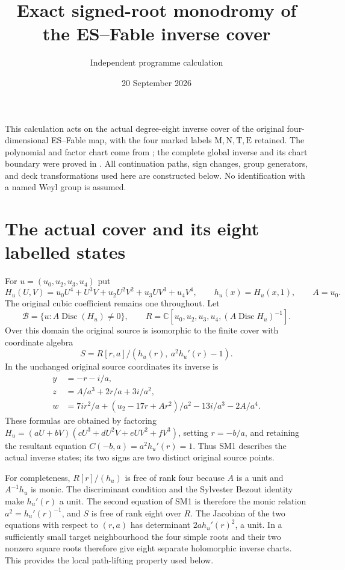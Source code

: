 \documentclass[11pt]{article}
\title{Exact signed-root monodromy of the ES--Fable inverse cover}
\author{Independent programme calculation}
\date{20 September 2026}
\newcommand{\C}{\mathbb C}
\newcommand{\Disc}{\operatorname{Disc}}
\begin{document}
\maketitle

This calculation acts on the actual degree-eight inverse cover of
the original four-dimensional ES--Fable map, with the four marked
labels $\mathrm M,\mathrm N,\mathrm T,\mathrm E$ retained.
The polynomial and factor chart come from \cite{ES488}; the complete
global inverse and its chart boundary were proved in \cite{Global}.
All continuation paths, sign changes, group generators, and deck
transformations used here are constructed below. No identification
with a named Weyl group is assumed.

\section{The actual cover and its eight labelled states}
For $u=(u_0,u_2,u_3,u_4)$ put
\[
 H_u(U,V)=u_0U^4+U^3V+u_2U^2V^2+u_3UV^3+u_4V^4,
 \qquad h_u(x)=H_u(x,1),\qquad A=u_0.
\]
The original cubic coefficient remains one throughout. Let
\[
 \mathcal B=\{u:A\Disc(H_u)\ne0\},\qquad
 R=\C[u_0,u_2,u_3,u_4,(A\Disc H_u)^{-1}].
\]
Over this domain the original source is isomorphic to the finite
cover with coordinate algebra
\begin{equation}
 S=R[r,a]/(h_u(r),\ a^2h_u'(r)-1).\tag{SM1}
\end{equation}
In the unchanged original source coordinates its inverse is
\begin{align}
 y&=-r-i/a,\nonumber\\
 z&=A/a^3+2r/a+3i/a^2,\nonumber\\
 w&=7ir^2/a+(u_2-17r+Ar^2)/a^2-13i/a^3-2A/a^4.
 \tag{SM2}
\end{align}
These formulas are obtained by factoring
$H_u=(aU+bV)(cU^3+dU^2V+eUV^2+fV^3)$, setting $r=-b/a$,
and retaining the resultant equation
$C(-b,a)=a^2h_u'(r)=1$. Thus SM1 describes the actual inverse
states; its two signs are two distinct original source points.

For completeness, $R[r]/(h_u)$ is free of rank four because $A$
is a unit and $A^{-1}h_u$ is monic. The discriminant condition
and the Sylvester Bezout identity make $h_u'(r)$ a unit. The
second equation of SM1 is therefore the monic relation
$a^2=h_u'(r)^{-1}$, and $S$ is free of rank eight over $R$.
The Jacobian of the two equations with respect to $(r,a)$ has
determinant $2a h_u'(r)^2$, a unit. In a sufficiently small target
neighbourhood the four simple roots and their two nonzero square
roots therefore give eight separate holomorphic inverse charts.
This provides the local path-lifting property used below.
\end{document}
